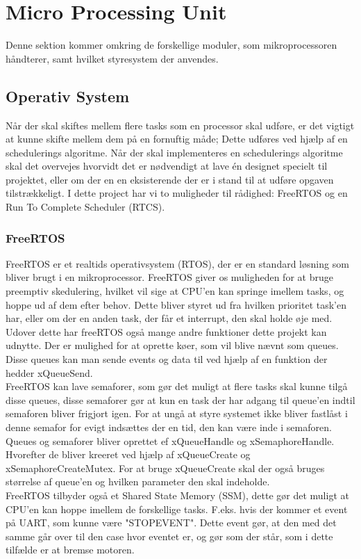 \section{Micro Processing Unit}

Denne sektion kommer omkring de forskellige moduler, som mikroprocessoren håndterer, samt hvilket styresystem der anvendes.

\subsection{Operativ System}
Når der skal skiftes mellem flere tasks som en processor skal udføre, er det vigtigt at kunne skifte mellem dem på en fornuftig måde; Dette udføres ved hjælp af en schedulerings algoritme. Når der skal implementeres en schedulerings algoritme skal det overvejes hvorvidt det er nødvendigt at lave én designet specielt til projektet, eller om der en en eksisterende der er i stand til at udføre opgaven tilstrækkeligt. I dette project har vi to muligheder til rådighed: FreeRTOS\cite{FreeRTOSorg} og en Run To Complete Scheduler (RTCS).

\subsubsection{FreeRTOS}

FreeRTOS \cite{FreeRTOSorg} er et realtids operativsystem (RTOS), der er en standard løsning som bliver brugt i en mikroprocessor. FreeRTOS giver os muligheden for at bruge preemptiv skedulering, hvilket vil sige at CPU'en kan springe imellem tasks, og hoppe ud af dem efter behov. Dette bliver styret ud fra hvilken prioritet task'en har, eller om der en anden task, der får et interrupt, den skal holde øje med.
\\
Udover dette har freeRTOS også mange andre funktioner dette projekt kan udnytte. Der er mulighed for at oprette køer, som vil blive nævnt som queues. Disse queues kan man sende events og data til ved hjælp af en funktion der hedder xQueueSend. 
\\
FreeRTOS kan lave semaforer, som gør det muligt at flere tasks skal kunne tilgå disse queues, disse semaforer gør at kun en task der har adgang til queue'en indtil semaforen bliver frigjort igen. For at ungå at styre systemet ikke bliver fastlåst i denne semafor for evigt indsættes der en tid, den kan være inde i semaforen.
\\
Queues og semaforer bliver oprettet ef xQueueHandle og xSemaphoreHandle. Hvorefter de bliver kreeret ved hjælp af xQueueCreate og xSemaphoreCreateMutex. For at bruge xQueueCreate skal der også bruges størrelse af queue'en og hvilken parameter den skal indeholde.
\\
FreeRTOS tilbyder også et Shared State Memory (SSM), dette gør det muligt at CPU'en kan hoppe imellem de forskellige tasks. F.eks. hvis der kommer et event på UART, som kunne være "STOP\textunderscore EVENT". Dette event gør, at den med det samme går over til den case hvor eventet er, og gør som der står, som i dette tilfælde er at bremse motoren.


